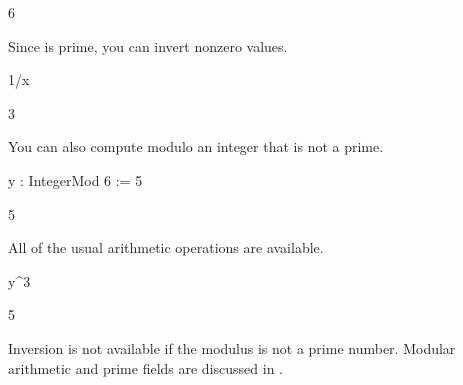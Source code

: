 {{{{{{{{\begin{xtc}
\begin{TeXOutput}
\begin{fricasmath}{26}
6%
\end{fricasmath}
\end{TeXOutput}
\end{xtc}
\begin{xtc}
\begin{xtccomment}
Since  is prime, you can invert nonzero values.
\end{xtccomment}
\begin{spadsrc}
1/x 
\end{spadsrc}
\begin{TeXOutput}
\begin{fricasmath}{27}
3%
\end{fricasmath}
\end{TeXOutput}
\end{xtc}
\begin{xtc}
\begin{xtccomment}
You can also compute modulo an integer that is not a prime.
\end{xtccomment}
\begin{spadsrc}
y : IntegerMod 6 := 5 
\end{spadsrc}
\begin{TeXOutput}
\begin{fricasmath}{28}
5%
\end{fricasmath}
\end{TeXOutput}
\end{xtc}
\begin{xtc}
\begin{xtccomment}
All of the usual arithmetic operations are available.
\end{xtccomment}
\begin{spadsrc}
y^3 
\end{spadsrc}
\begin{TeXOutput}
\begin{fricasmath}{29}
5%
\end{fricasmath}
\end{TeXOutput}
\end{xtc}
\begin{xtc}
\begin{xtccomment}
Inversion is not available if the modulus is not a prime
number.
Modular arithmetic and prime fields are discussed in
.
\end{xtccomment}

\end{xtc}}}}}}}}}
